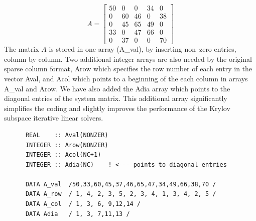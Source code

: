 \documentclass[10pt]{article}
\newcommand*{\tc}{\ttfamily} %
\begin{document}
    \begin{equation}
     A=
     \left [
     \begin {array}{r} 
        50  \\   0  \\   0  \\  33  \\   0
     \end {array}
     \begin {array}{r} 
         0  \\  60  \\  45  \\   0  \\  37
     \end {array}
     \begin {array}{r} 
          0  \\  46  \\  65  \\  47  \\   0 
     \end {array}
     \begin {array}{r} 
         34  \\   0  \\  49  \\  66  \\  0
     \end {array}
     \begin {array}{r} 
          0  \\  38  \\   0  \\   0  \\  70
     \end {array}
     \right ]
                                \label{A}
    \end{equation}
    The matrix $A$ is stored in one array ({\tc A\_val}), by 
    inserting non--zero
    entries, column by column. Two additional integer arrays
    are also needed by the original sparse column format,
    {\tc Arow} which specifies the row number of each entry
    in the vector {\tc Aval}, and {\tc Acol} which points to
    a beginning of the each column in arrays {\tc A\_val} and
    {\tc Arow}. We have also added the {\tc Adia} array
    which points to the diagonal entries of the system matrix.
    This additional array significantly simplifies the coding
    and slightly improves the performance of the Krylov
    subspace iterative linear solvers.
    \small \begin{verbatim}
      REAL    :: Aval(NONZER)
      INTEGER :: Arow(NONZER)
      INTEGER :: Acol(NC+1)
      INTEGER :: Adia(NC)    ! <--- points to diagonal entries 

      DATA A_val  /50,33,60,45,37,46,65,47,34,49,66,38,70 /
      DATA A_row  / 1, 4, 2, 3, 5, 2, 3, 4, 1, 3, 4, 2, 5 /
      DATA A_col  / 1, 3, 6, 9,12,14 /
      DATA Adia   / 1, 3, 7,11,13 / 
    \end{verbatim} \normalsize
\end{document}
